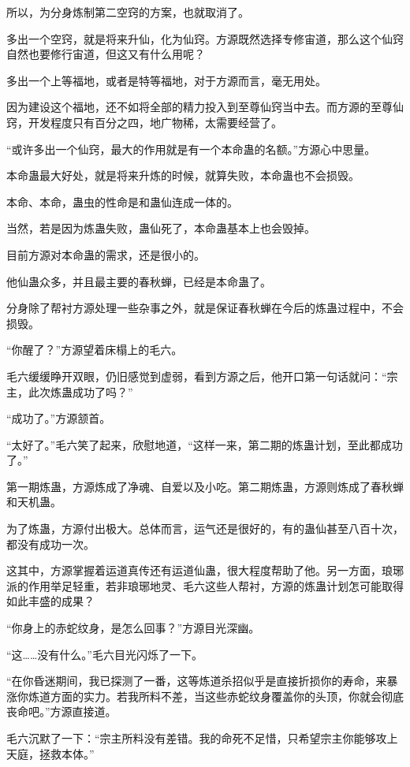 \begin{this_body}
所以，为分身炼制第二空窍的方案，也就取消了。

多出一个空窍，就是将来升仙，化为仙窍。方源既然选择专修宙道，那么这个仙窍自然也要修行宙道，但这又有什么用呢？

多出一个上等福地，或者是特等福地，对于方源而言，毫无用处。

因为建设这个福地，还不如将全部的精力投入到至尊仙窍当中去。而方源的至尊仙窍，开发程度只有百分之四，地广物稀，太需要经营了。

“或许多出一个仙窍，最大的作用就是有一个本命蛊的名额。”方源心中思量。

本命蛊最大好处，就是将来升炼的时候，就算失败，本命蛊也不会损毁。

本命、本命，蛊虫的性命是和蛊仙连成一体的。

当然，若是因为炼蛊失败，蛊仙死了，本命蛊基本上也会毁掉。

目前方源对本命蛊的需求，还是很小的。

他仙蛊众多，并且最主要的春秋蝉，已经是本命蛊了。

分身除了帮衬方源处理一些杂事之外，就是保证春秋蝉在今后的炼蛊过程中，不会损毁。

“你醒了？”方源望着床榻上的毛六。

毛六缓缓睁开双眼，仍旧感觉到虚弱，看到方源之后，他开口第一句话就问：“宗主，此次炼蛊成功了吗？”

“成功了。”方源颔首。

“太好了。”毛六笑了起来，欣慰地道，“这样一来，第二期的炼蛊计划，至此都成功了。”

第一期炼蛊，方源炼成了净魂、自爱以及小吃。第二期炼蛊，方源则炼成了春秋蝉和天机蛊。

为了炼蛊，方源付出极大。总体而言，运气还是很好的，有的蛊仙甚至八百十次，都没有成功一次。

这其中，方源掌握着运道真传还有运道仙蛊，很大程度帮助了他。另一方面，琅琊派的作用举足轻重，若非琅琊地灵、毛六这些人帮衬，方源的炼蛊计划怎可能取得如此丰盛的成果？

“你身上的赤蛇纹身，是怎么回事？”方源目光深幽。

“这……没有什么。”毛六目光闪烁了一下。

“在你昏迷期间，我已探测了一番，这等炼道杀招似乎是直接折损你的寿命，来暴涨你炼道方面的实力。若我所料不差，当这些赤蛇纹身覆盖你的头顶，你就会彻底丧命吧。”方源直接道。

毛六沉默了一下：“宗主所料没有差错。我的命死不足惜，只希望宗主你能够攻上天庭，拯救本体。”


\end{this_body}
